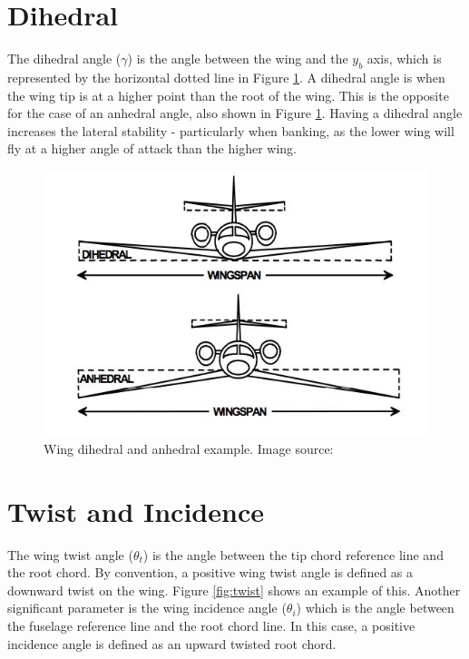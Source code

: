 \section{Dihedral}
The dihedral angle ($\gamma$) is the angle between the wing and the $y_b$ axis, which is represented by the horizontal dotted line in Figure \ref{fig:dihedral}. A dihedral angle is when the wing tip is at a higher point than the root of the wing. This is the opposite for the case of an anhedral angle, also shown in Figure \ref{fig:dihedral}. Having a dihedral angle increases the lateral stability - particularly when banking, as the lower wing will fly at a higher angle of attack than the higher wing. 

\begin{figure}[H]
  \centering
   \includegraphics[width=1\linewidth]{03_LiteratureReview/Figs/dihedral.jpg}
  \caption{Wing dihedral and anhedral example. Image source: \cite{moreplane}}
  \label{fig:dihedral}
\end{figure}

\section{Twist and Incidence}
The wing twist angle ($\theta_t$) is the angle between the tip chord reference line and the root chord. By convention, a positive wing twist angle is defined as a downward twist on the wing. Figure \ref{fig:twist} shows an example of this. Another significant parameter is the wing incidence angle ($\theta_i$) which is the angle between the fuselage reference line and the root chord line. In this case, a positive incidence angle is defined as an upward twisted root chord. 

